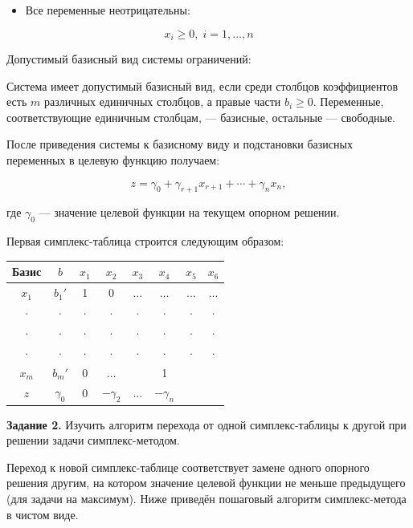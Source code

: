 \documentclass[a4paper,14pt]{extarticle}
\begin{document}
\begin{itemize}
\item Все переменные неотрицательны:
\end{itemize}

\[
x_i\geq0,\; i=1,\ldots,n
\]

Допустимый базисный вид системы ограничений:

Система имеет допустимый базисный вид, если среди столбцов коэффициентов есть $m$ различных единичных столбцов, а правые части $b_i\geq0$. Переменные, соответствующие единичным столбцам, — базисные, остальные — свободные.

После приведения системы к базисному виду и подстановки базисных переменных в целевую функцию получаем:

\[
z=\gamma_0+\gamma_{r+1}x_{r+1}+\cdots+\gamma_n x_n,
\]

где $\gamma_0$ — значение целевой функции на текущем опорном решении.

\vspace{0.5cm}

Первая симплекс-таблица строится следующим образом:

\begin{center}
\begin{tabular}{|c|c|c|c|c|c|c|c|}
\hline
Базис & $b$ & $x_1$ & $x_2$ & $x_3$ & $x_4$ & $x_5$ & $x_6$ \\
\hline
$x_1$ & $b_1'$ & 1 & 0 & $\ldots$ & $\ldots$ & $\ldots$ & $\ldots$ \\
\hline
$\cdot$ & $\cdot$ & $\cdot$ & $\cdot$ & $\cdot$ & $\cdot$ & $\cdot$ & $\cdot$ \\
\hline
$\cdot$ & $\cdot$ & $\cdot$ & $\cdot$ & $\cdot$ & $\cdot$ & $\cdot$ & $\cdot$ \\
\hline
$\cdot$ & $\cdot$ & $\cdot$ & $\cdot$ & $\cdot$ & $\cdot$ & $\cdot$ & $\cdot$ \\
\hline
$x_m$ & $b_m'$ & 0 & $\ldots$ &  & 1 &  &  \\
\hline
$z$ & $\gamma_0$ & 0 & $-\gamma_2$ & $\ldots$ & $-\gamma_n$ &  &  \\
\hline
\end{tabular}
\end{center}

\textbf{Задание 2.} Изучить алгоритм перехода от одной симплекс-таблицы к другой
при решении задачи симплекс-методом.

Переход к новой симплекс-таблице соответствует замене одного опорного решения другим, на котором значение целевой функции не меньше предыдущего (для задачи на максимум). Ниже приведён пошаговый алгоритм симплекс-метода в чистом виде.
\end{document}
